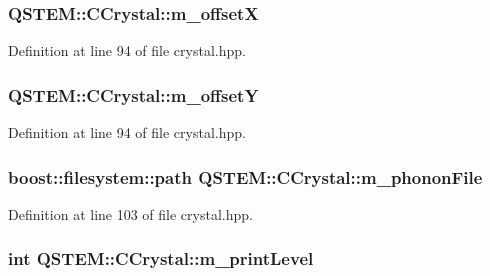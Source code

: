 \hypertarget{class_q_s_t_e_m_1_1_c_crystal_a03c6753a1056bd059f7e6d84101f34d6}{
\subsubsection[{m\-\_\-offset\-X}]{ Q\-S\-T\-E\-M\-::\-C\-Crystal\-::m\-\_\-offset\-X\hspace{0.3cm}{\ttfamily [protected]}}}\label{class_q_s_t_e_m_1_1_c_crystal_a03c6753a1056bd059f7e6d84101f34d6}


Definition at line 94 of file crystal.\-hpp.

\hypertarget{class_q_s_t_e_m_1_1_c_crystal_abe16ff6d97a76f434efdb08f01c2297a}{
\subsubsection[{m\-\_\-offset\-Y}]{ Q\-S\-T\-E\-M\-::\-C\-Crystal\-::m\-\_\-offset\-Y\hspace{0.3cm}{\ttfamily [protected]}}}\label{class_q_s_t_e_m_1_1_c_crystal_abe16ff6d97a76f434efdb08f01c2297a}


Definition at line 94 of file crystal.\-hpp.

\hypertarget{class_q_s_t_e_m_1_1_c_crystal_a9b936fcf70d65b7be30bc0c3297d0d78}{
\subsubsection[{m\-\_\-phonon\-File}]{\setlength{\rightskip}{0pt plus 5cm}boost\-::filesystem\-::path Q\-S\-T\-E\-M\-::\-C\-Crystal\-::m\-\_\-phonon\-File\hspace{0.3cm}{\ttfamily [protected]}}}\label{class_q_s_t_e_m_1_1_c_crystal_a9b936fcf70d65b7be30bc0c3297d0d78}


Definition at line 103 of file crystal.\-hpp.

\hypertarget{class_q_s_t_e_m_1_1_c_crystal_aa14cfe504fe4ffbe164db76c64d5e8a1}{
\subsubsection[{m\-\_\-print\-Level}]{\setlength{\rightskip}{0pt plus 5cm}int Q\-S\-T\-E\-M\-::\-C\-Crystal\-::m\-\_\-print\-Level\hspace{0.3cm}{\ttfamily [protected]}}}\label{class_q_s_t_e_m_1_1_c_crystal_aa14cfe504fe4ffbe164db76c64d5e8a1}


